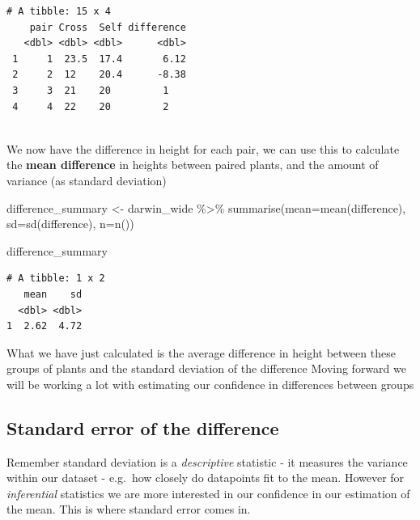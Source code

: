 \documentclass[
]{book}
\makeatletter
\newenvironment{Shaded}{\begin{snugshade}}{\end{snugshade}}
\newcommand{\AttributeTok}[1]{\textcolor[rgb]{0.77,0.63,0.00}{#1}}
\newcommand{\FunctionTok}[1]{\textcolor[rgb]{0.00,0.00,0.00}{#1}}
\newcommand{\NormalTok}[1]{#1}
\newcommand{\OtherTok}[1]{\textcolor[rgb]{0.56,0.35,0.01}{#1}}
\newcommand{\SpecialCharTok}[1]{\textcolor[rgb]{0.00,0.00,0.00}{#1}}
\newenvironment{kframe}{%
\medskip{}
\setlength{\fboxsep}{.8em}
 \def\at@end@of@kframe{}%
 \ifinner\ifhmode%
  \def\at@end@of@kframe{\end{minipage}}%
  \begin{minipage}{\columnwidth}%
 \fi\fi%
 \def\FrameCommand##1{\hskip\@totalleftmargin \hskip-\fboxsep
 \colorbox{shadecolor}{##1}\hskip-\fboxsep
     \hskip-\linewidth \hskip-\@totalleftmargin \hskip\columnwidth}%
 \MakeFramed {\advance\hsize-\width
   \@totalleftmargin\z@ \linewidth\hsize
   \@setminipage}}%
 {\par\unskip\endMakeFramed%
 \at@end@of@kframe}
\newenvironment{block}[1]
  {
  \begin{itemize}
  \renewcommand{\labelitemi}{
    \raisebox{-.7\height}[0pt][0pt]{
      {\setkeys{Gin}{width=3em,keepaspectratio}\texttt{[image: images/\#1]}}
    }
  }
  \setlength{\fboxsep}{1em}
  \begin{kframe}
  \item
  }
  {
  \end{kframe}
  \end{itemize}
  }
\newenvironment{rmdwarning}
  {\begin{block}{warning}}
  {\end{block}}
\makeatother
\begin{document}
\begin{verbatim}
# A tibble: 15 x 4
    pair Cross  Self difference
   <dbl> <dbl> <dbl>      <dbl>
 1     1  23.5  17.4       6.12
 2     2  12    20.4      -8.38
 3     3  21    20         1   
 4     4  22    20         2   
 
\end{verbatim}

We now have the difference in height for each pair, we can use this to calculate the \textbf{mean difference} in heights between paired plants, and the amount of variance (as standard deviation)

\begin{Shaded}
\begin{Highlighting}[]
\NormalTok{difference\_summary }\OtherTok{\textless{}{-}}\NormalTok{ darwin\_wide }\SpecialCharTok{\%\textgreater{}\%} 
  \FunctionTok{summarise}\NormalTok{(}\AttributeTok{mean=}\FunctionTok{mean}\NormalTok{(difference),}
            \AttributeTok{sd=}\FunctionTok{sd}\NormalTok{(difference),}
            \AttributeTok{n=}\FunctionTok{n}\NormalTok{())}

\NormalTok{difference\_summary}
\end{Highlighting}
\end{Shaded}

\begin{verbatim}
# A tibble: 1 x 2
   mean    sd
  <dbl> <dbl>
1  2.62  4.72
\end{verbatim}

\begin{rmdwarning}
What we have just calculated is the average difference in height between
these groups of plants and the standard deviation of the difference
Moving forward we will be working a lot with estimating our confidence
in differences between groups
\end{rmdwarning}

\hypertarget{standard-error-of-the-difference}{%
\subsection{Standard error of the difference}\label{standard-error-of-the-difference}}

Remember standard deviation is a \emph{descriptive} statistic - it measures the variance within our dataset - e.g.~how closely do datapoints fit to the mean. However for \emph{inferential} statistics we are more interested in our confidence in our estimation of the mean. This is where standard error comes in.
\end{document}
